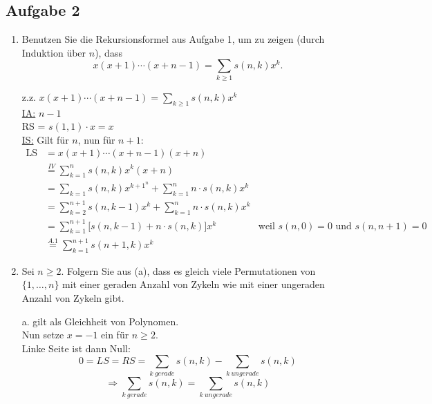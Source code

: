 \documentclass{article} %
\begin{document}
    \subsection*{Aufgabe 2}
    \begin{enumerate}
        \item[(a)] Benutzen Sie die Rekursionsformel aus Aufgabe 1, um zu zeigen (durch Induktion über $n$), dass
        \[
        x(x + 1) \cdots (x + n - 1) = \sum_{k \geq 1} s(n, k)x^k.
        \]
        \begin{mybox}
        z.z. $x(x + 1) \cdots (x + n - 1) = \sum_{k \geq 1} s(n, k)x^k$ \\ \newline
        \underline{IA:} $n-1$ \\
        RS = $s(1,1)\cdot x = x$ \\ \newline
        \underline{IS:} Gilt für $n$, nun für $n+1$: 
        \begin{align*}
            \text{LS} & = x(x + 1) \cdots (x + n - 1)(x+n) \\
            & \overset{IV}{=} \sum_{k = 1}^n s(n, k)x^k (x+n) \\
            & = \sum_{k = 1} s(n, k)x^{k+1}^n + \sum_{k = 1}^n n \cdot s(n, k)x^k \\
            & = \sum_{k = 2}^{n+1} s(n, k-1)x^{k} + \sum_{k = 1}^{n} n \cdot s(n, k)x^k \\
            & = \sum_{k = 1}^{n+1} \big[s(n,k-1) + n \cdot s(n,k) \big] x^k & \text{weil } s(n,0) = 0 \text{ und } s(n,n+1) = 0 \\
            & \overset{A. 1}{=} \sum_{k = 1}^{n+1} s(n+1, k) x^k
        \end{align*}
        \end{mybox}
        \item[(b)] Sei $n \geq 2$. Folgern Sie aus (a), dass es gleich viele Permutationen von $\{1, \dots, n\}$ mit einer geraden Anzahl von Zykeln wie mit einer ungeraden Anzahl von Zykeln gibt.
        \begin{mybox}
        a. gilt als Gleichheit von Polynomen. \\
        Nun setze $x=-1$ ein für $n \geq 2$. \\ \newline
        Linke Seite ist dann Null:
        \[ 0 = LS = RS = \sum_{k\ gerade} s(n,k) - \sum_{k\ ungerade} s(n,k)\]
        \[ \Rightarrow \sum_{k\ gerade} s(n,k) = \sum_{k\ ungerade} s(n,k)\]
        \end{mybox}
    \end{enumerate}
    \newpage
\end{document}
